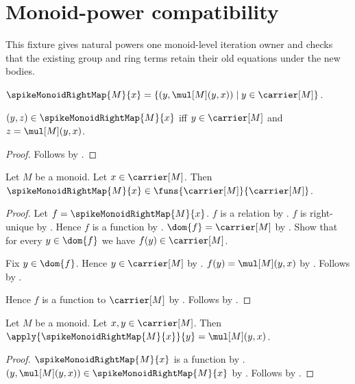 



\section{Monoid-power compatibility}

This fixture gives natural powers one monoid-level iteration owner and checks
that the existing group and ring terms retain their old equations under the
new bodies.

\begin{definition}\label{spike16_monoid_right_map}
    $\spikeMonoidRightMap{M}{x}=
        \{(y,\mul[M](y,x))\mid y\in\carrier[M]\}$.
\end{definition}

\begin{proposition}\label{spike16_monoid_right_map_iff}
    $(y,z)\in\spikeMonoidRightMap{M}{x}$ iff
        $y\in\carrier[M]$ and $z=\mul[M](y,x)$.
\end{proposition}
\begin{proof}
    Follows by
        .
\end{proof}

\begin{proposition}\label{spike16_monoid_right_map_type}
    Let $M$ be a monoid.
    Let $x\in\carrier[M]$.
    Then $\spikeMonoidRightMap{M}{x}\in
        \funs{\carrier[M]}{\carrier[M]}$.
\end{proposition}
\begin{proof}
    Let $f=\spikeMonoidRightMap{M}{x}$.
    $f$ is a relation by
        .
    $f$ is right-unique by
        .
    Hence $f$ is a function by \auto.
    $\dom{f}=\carrier[M]$ by
        .
    Show that for every $y\in\dom{f}$ we have $f(y)\in\carrier[M]$.
    \begin{subproof}
        Fix $y\in\dom{f}$.
        Hence $y\in\carrier[M]$ by \auto.
        $f(y)=\mul[M](y,x)$ by
            .
        Follows by .
    \end{subproof}
    Hence $f$ is a function to $\carrier[M]$ by \auto.
    Follows by .
\end{proof}

\begin{proposition}\label{spike16_monoid_right_map_apply}
    Let $M$ be a monoid.
    Let $x,y\in\carrier[M]$.
    Then $\apply{\spikeMonoidRightMap{M}{x}}{y}=\mul[M](y,x)$.
\end{proposition}
\begin{proof}
    $\spikeMonoidRightMap{M}{x}$ is a function by
        .
    $(y,\mul[M](y,x))\in\spikeMonoidRightMap{M}{x}$ by
        .
    Follows by .
\end{proof}

